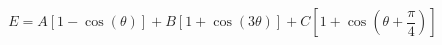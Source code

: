 \documentclass[12pt]{article}
\begin{document}
$$
  E = A [1 - \cos(\theta)] + B [1 + \cos(3 \theta)] + 
      C [1 + \cos(\theta + \frac{\pi}{4})]
$$
\end{document}
